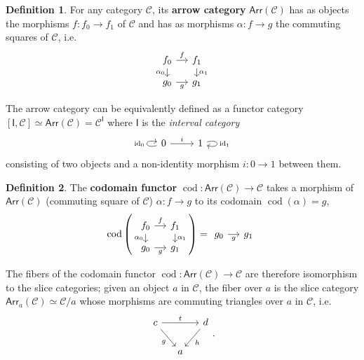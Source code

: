 \documentclass[12pt]{article}
\theoremstyle{definition}
\newtheorem{defn}{Definition}[section]
\theoremstyle{remark}
\DeclareMathOperator{\id}{id} %
\DeclareMathOperator{\cod}{cod}
\newcommand{\arr}{\mathsf{Arr}} %
\newcommand{\catC}{\mathcal{C}}
\begin{document}
\begin{defn}
    \label{def:arrow_category}
    For any category $\catC$, its \textbf{arrow category} $\arr(\catC)$ has as objects the morphisms $f : f_0 \to f_1$ of $\catC$ and has as morphisms $\alpha : f \to g$ the commuting squares of $\catC$, i.e.
    \begin{equation}
        \begin{tikzcd}[row sep=small, column sep=small]
            f_0 \ar[r, "f"] \ar[d, "\alpha_0"'] & f_1 \ar[d, "\alpha_1"] \\
            g_0 \ar[r, "g"'] & g_1
        \end{tikzcd}
    \end{equation}
\end{defn}
The arrow category can be equivalently defined as a functor category $[\mathsf{I}, \catC] \simeq \arr(\catC) = \catC^{\mathsf{I}}$ where $\mathsf{I}$ is the \textit{interval category}
\begin{equation}
    \begin{tikzcd}
        0 \ar[loop left, "\id_{0}"] \ar[r, "i"] & 1 \ar[loop right, "\id_{1}"]
    \end{tikzcd}
\end{equation}
consisting of two objects and a non-identity morphism $i : 0 \to 1$ between them.

\begin{defn}
    The \textbf{codomain functor} $\cod : \arr(\catC) \to \catC$ takes a morphism of $\arr(\catC)$ (commuting square of $\catC$) $\alpha : f \to g$ to its codomain $\cod (\alpha) = g$,
    \begin{equation}
        \cod \left(
            \begin{tikzcd}[row sep=small, column sep=small]
                f_0 \ar[r, "f"] \ar[d, "\alpha_0"'] & f_1 \ar[d, "\alpha_1"] \\
                g_0 \ar[r, "g"'] & g_1
            \end{tikzcd}
        \right)
        =
        \begin{tikzcd}[column sep=small]
            g_0 \ar[r, "g"'] & g_1
        \end{tikzcd}
    \end{equation}
\end{defn}

The fibers of the codomain functor $\cod : \arr(\catC) \to \catC$ are therefore isomorphism to the slice categories; given an object $a$ in $\catC$, the fiber over $a$ is the slice category $\arr_{a}(\catC) \simeq \catC / a$ whose morphisms are commuting triangles over $a$ in $\catC$, i.e.
\begin{equation}
    \begin{tikzcd}[column sep=small]
        c \ar[dr, "g"'] \ar[rr, "t"] & & d \ar[dl, "h"] \\
        & a &
    \end{tikzcd}.
\end{equation}
\end{document}
